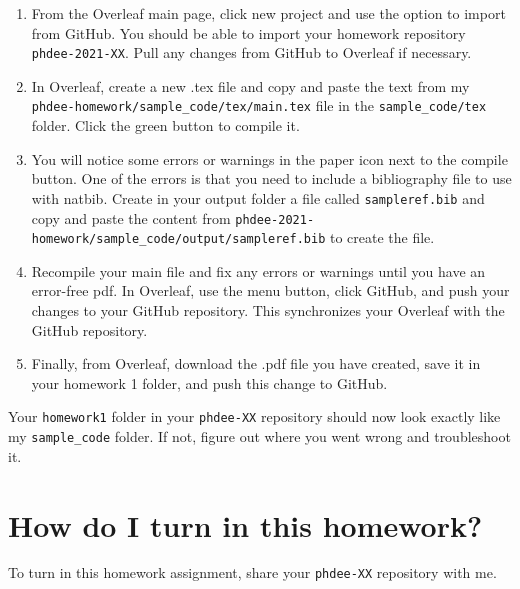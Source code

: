 \documentclass{article}
\begin{document}
\begin{enumerate}
    \item From the Overleaf main page, click new project and use the option to import from GitHub.  You should be able to import your homework repository \verb!phdee-2021-XX!.  Pull any changes from GitHub to Overleaf if necessary.
    \item In Overleaf, create a new .tex file and copy and paste the text from my \verb!phdee-homework/sample_code/tex/main.tex! file in the \verb!sample_code/tex! folder.  Click the green button to compile it.
    \item You will notice some errors or warnings in the paper icon next to the compile button.  One of the errors is that you need to include a bibliography file to use with natbib. Create in your output folder a file called \verb!sampleref.bib! and copy and paste the content from \verb!phdee-2021-homework/sample_code/output/sampleref.bib! to create the file.
    \item Recompile your main file and fix any errors or warnings until you have an error-free pdf.  In Overleaf, use the menu button, click GitHub, and push your changes to your GitHub repository.  This synchronizes your Overleaf with the GitHub repository.
    \item Finally, from Overleaf, download the .pdf file you have created, save it in your homework 1 folder, and push this change to GitHub.
\end{enumerate}
Your \verb!homework1! folder in your \verb!phdee-XX! repository should now look exactly like my \verb!sample_code! folder.  If not, figure out where you went wrong and troubleshoot it.

\section*{How do I turn in this homework?}

\noindent To turn in this homework assignment, share your \verb!phdee-XX! repository with me.
\end{document}
